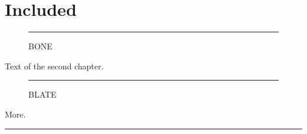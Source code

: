 \chapter{Included}
\begin{figure}[h]\centering\rule{2cm}{5mm}\caption{BONE}\end{figure}
Text of the second chapter.
\clearpage
\begin{figure}[p]\centering\rule{4cm}{4cm}\caption{BLATE}\end{figure}
More.
\begin{marginfigure}\rule{2cm}{5mm}\caption{BEARLY}\end{marginfigure}
\lipsum[1]

